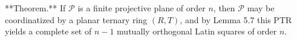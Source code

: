 **Theorem.** If $\mathcal{P}$ is a finite projective plane of order $n$, then $\mathcal{P}$ may be coordinatized by a planar ternary ring $(R, T)$, and by Lemma 5.7 this PTR yields a complete set of $n-1$ mutually orthogonal Latin squares of order $n$.
